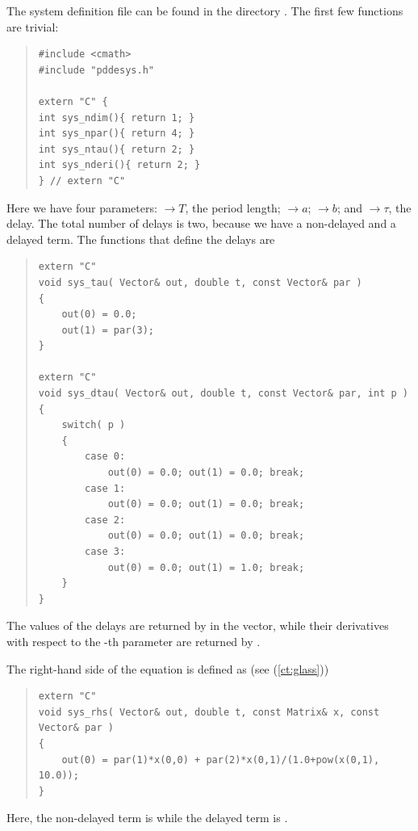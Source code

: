 \documentclass[10pt,a4paper]{ddedoc}
\begin{document}
The system definition file can be found in the directory
. The first few functions are trivial:
{ \small \begin{quote} \begin{lstlisting}[frame=single]
#include <cmath>
#include "pddesys.h"

extern "C" {
int sys_ndim(){ return 1; }
int sys_npar(){ return 4; }
int sys_ntau(){ return 2; }
int sys_nderi(){ return 2; }
} // extern "C"
\end{lstlisting} \end{quote} } \noindent
Here we have four parameters:
$\to T$, the period length;
$\to a$;
$\to b$; and
$\to \tau$, the delay.
The total number of delays is two, because we have a non-delayed and a delayed
term.
The functions that define the delays are
{ \small \begin{quote} \begin{lstlisting}[frame=single]
extern "C"
void sys_tau( Vector& out, double t, const Vector& par ) 
{
	out(0) = 0.0;
	out(1) = par(3);
}

extern "C"
void sys_dtau( Vector& out, double t, const Vector& par, int p ) 
{
	switch( p )
	{
		case 0:
			out(0) = 0.0; out(1) = 0.0; break;
		case 1:
			out(0) = 0.0; out(1) = 0.0; break;
		case 2:
			out(0) = 0.0; out(1) = 0.0; break;
		case 3:
			out(0) = 0.0; out(1) = 1.0; break;
	}
}
\end{lstlisting} \end{quote} } \noindent
The values of the delays are returned by  in the 
vector, while their derivatives with respect to the -th parameter are
returned by .

The right-hand side of the equation is defined as (see (\ref{ct:glass}))
{ \small \begin{quote} \begin{lstlisting}[frame=single]
extern "C"
void sys_rhs( Vector& out, double t, const Matrix& x, const Vector& par )
{
	out(0) = par(1)*x(0,0) + par(2)*x(0,1)/(1.0+pow(x(0,1), 10.0));
}
\end{lstlisting} \end{quote} } \noindent
Here, the non-delayed term is  while the delayed term
is .
\end{document}
